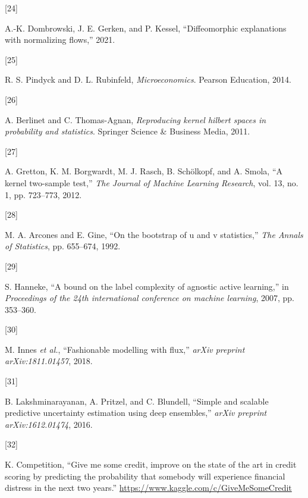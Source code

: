 \documentclass[
  conference]{IEEEtran}
\newlength{\cslhangindent}
\newlength{\csllabelwidth}
\newlength{\cslentryspacingunit} %
\newenvironment{CSLReferences}[2] %
 {%
  \setlength{\parindent}{0pt}
  \ifodd #1
  \let\oldpar\par
  \def\par{\hangindent=\cslhangindent\oldpar}
  \fi
  \setlength{\parskip}{#2\cslentryspacingunit}
 }%
 {}
\newcommand{\CSLLeftMargin}[1]{\parbox[t]{\csllabelwidth}{#1}}
\newcommand{\CSLRightInline}[1]{\parbox[t]{\linewidth - \csllabelwidth}{#1}\break}
\begin{document}
\begin{CSLReferences}{0}{0}
\leavevmode{}%
\CSLLeftMargin{{[}24{]} }%
\CSLRightInline{A.-K. Dombrowski, J. E. Gerken, and P. Kessel,
{``Diffeomorphic explanations with normalizing flows,''} 2021.}

\leavevmode{}%
\CSLLeftMargin{{[}25{]} }%
\CSLRightInline{R. S. Pindyck and D. L. Rubinfeld,
\emph{Microeconomics}. Pearson Education, 2014.}

\leavevmode{}%
\CSLLeftMargin{{[}26{]} }%
\CSLRightInline{A. Berlinet and C. Thomas-Agnan, \emph{Reproducing
kernel hilbert spaces in probability and statistics}. Springer Science
\& Business Media, 2011.}

\leavevmode{}%
\CSLLeftMargin{{[}27{]} }%
\CSLRightInline{A. Gretton, K. M. Borgwardt, M. J. Rasch, B. Schölkopf,
and A. Smola, {``A kernel two-sample test,''} \emph{The Journal of
Machine Learning Research}, vol. 13, no. 1, pp. 723--773, 2012.}

\leavevmode{}%
\CSLLeftMargin{{[}28{]} }%
\CSLRightInline{M. A. Arcones and E. Gine, {``On the bootstrap of u and
v statistics,''} \emph{The Annals of Statistics}, pp. 655--674, 1992.}

\leavevmode{}%
\CSLLeftMargin{{[}29{]} }%
\CSLRightInline{S. Hanneke, {``A bound on the label complexity of
agnostic active learning,''} in \emph{Proceedings of the 24th
international conference on machine learning}, 2007, pp. 353--360.}

\leavevmode{}%
\CSLLeftMargin{{[}30{]} }%
\CSLRightInline{M. Innes \emph{et al.}, {``Fashionable modelling with
flux,''} \emph{arXiv preprint arXiv:1811.01457}, 2018.}

\leavevmode{}%
\CSLLeftMargin{{[}31{]} }%
\CSLRightInline{B. Lakshminarayanan, A. Pritzel, and C. Blundell,
{``Simple and scalable predictive uncertainty estimation using deep
ensembles,''} \emph{arXiv preprint arXiv:1612.01474}, 2016.}

\leavevmode{}%
\CSLLeftMargin{{[}32{]} }%
\CSLRightInline{K. Competition, {``Give me some credit, improve on the
state of the art in credit scoring by predicting the probability that
somebody will experience financial distress in the next two years.''}
\url{https://www.kaggle.com/c/GiveMeSomeCredit}}


\end{CSLReferences}
\end{document}
